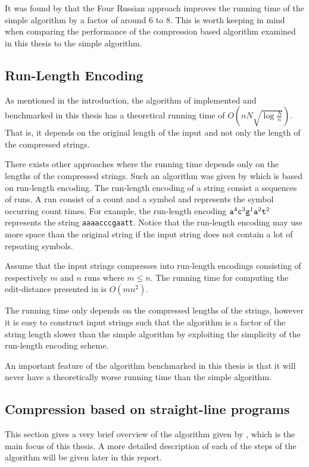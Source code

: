 \documentclass[twoside,11pt,openright]{report}
\begin{document}
It was found by \cite{LasseFourRussian} that the Four Russian approach improves the running time of the simple algorithm by a factor of around $6$ to $8$. This is worth keeping in mind when comparing the performance of the compression based algorithm examined in this thesis to the simple algorithm.

\subsection{Run-Length Encoding}
As mentioned in the introduction, the algorithm of \cite{Gawrychowski:2012:FAC:2422024.2422048} implemented and benchmarked in this thesis has a theoretical running time of $O(n N \sqrt{\log{\frac{N}{n}}})$. That is, it depends on the original length of the input and not only the length of the compressed strings.

There exists other approaches where the running time depends only on the lengths of the compressed strings. Such an algorithm was given by \cite{Chen:2010:FCA:1888935.1888984} which is based on run-length encoding. The run-length encoding of a string consist a sequences of runs. A run consist of a count and a symbol and represents the symbol occurring count times. For example, the run-length encoding $\text{\texttt{a}}^4\text{\texttt{c}}^3\text{\texttt{g}}^1\text{\texttt{a}}^2\text{\texttt{t}}^2$ represents the string \texttt{aaaacccgaatt}. Notice that the run-length encoding may use more space than the original string if the input string does not contain a lot of repeating symbols. 

Assume that the input strings compresses into run-length encodings consisting of respectively $m$ and $n$ runs where $m \leq n$. The running time for computing the edit-distance presented in \cite{Chen:2010:FCA:1888935.1888984} is $O(mn^2)$.

The running time only depends on the compressed lengths of the strings, however it is easy to construct input strings such that the algorithm is a factor of the string length slower than the simple algorithm by exploiting the simplicity of the run-length encoding scheme.

An important feature of the algorithm benchmarked in this thesis is that it will never have a theoretically worse running time than the simple algorithm.

\subsection{Compression based on straight-line programs}
\label{sec:edit-dist-on-slps-steps}
This section gives a very brief overview of the algorithm given by \cite{Gawrychowski:2012:FAC:2422024.2422048}, which is the main focus of this thesis. A more detailed description of each of the steps of the algorithm will be given later in this report. 
\end{document}
